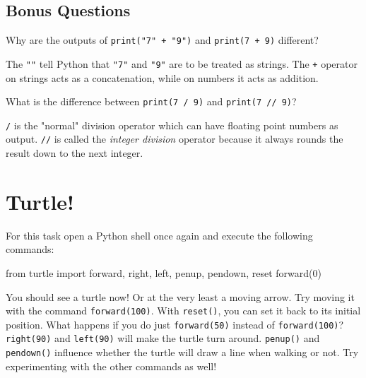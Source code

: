 \subsection{Bonus Questions}

Why are the outputs of \texttt{print("7" + "9")} and \texttt{print(7 + 9)} different?

\vspace {1em}

\begin{solution}
    The \texttt{""} tell Python that \texttt{"7"} and \texttt{"9"} are to be treated as strings. The \texttt{+} operator on strings acts as a concatenation, while on numbers it acts as addition.
\end{solution}

\vspace{1em}

\noindent What is the difference between \texttt{print(7 / 9)} and \texttt{print(7 // 9)}?

\begin{solution}
    \texttt{/} is the "normal" division operator which can have floating point numbers as output. \texttt{//} is called the \textit{integer division} operator because it always rounds the result down to the next integer.
\end{solution}

\section{Turtle!}

For this task open a Python shell once again and execute the following commands:

\begin{pythoncode}

from turtle import forward, right, left, penup, pendown, reset
forward(0)

\end{pythoncode}

\noindent You should see a turtle now! Or at the very least a moving arrow. Try moving it with the command \texttt{forward(100)}.
With \texttt{reset()}, you can set it back to its initial position. What happens if you do just \texttt{forward(50)} instead of \texttt{forward(100)}?
\texttt{right(90)} and \texttt{left(90)} will make the turtle turn around. \texttt{penup()} and \texttt{pendown()} influence whether the turtle will draw a line when walking or not. Try experimenting with the other commands as well!

\vspace{1em}

